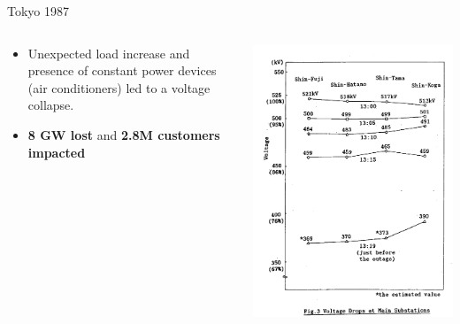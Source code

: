 \begin{frame}{Tokyo 1987}
\begin{columns}
\begin{column}{0.5\textwidth}
    \begin{itemize}
        \item Unexpected load increase and presence of constant power devices (air conditioners) led to a voltage collapse.
        \item \textbf{8 GW lost} and \textbf{2.8M customers impacted} \cite{ohno20061987, kurita1988power}
    \end{itemize}
\end{column}
\begin{column}{0.5\textwidth}
    \begin{center}
    \includegraphics[width=0.7\linewidth]{images/TokyoCollapse.png}
    \end{center}
\end{column}
\end{columns}

\end{frame}

